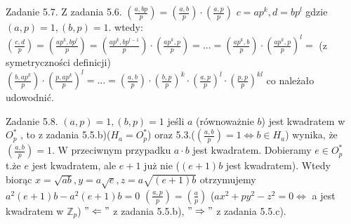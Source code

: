 \documentclass{article}
\begin{document}
Zadanie 5.7.
\newline
\newline
Z zadania 5.6. $(\frac{a,bp}{p})=(\frac{a,b}{p})\cdot(\frac{a,p}{p})$\newline
$c=ap^k,d=bp^l$ gdzie $(a,p)=1,(b,p)=1$. wtedy:\newline
$(\frac{c,d}{p})=(\frac{ap^k,bp^l}{p})=(\frac{ap^k,bp^{l-1}}{p})\cdot(\frac{ap^k,p}{p})=...=(\frac{ap^k,b}{p})\cdot(\frac{ap^k,p}{p})^l=$ (z symetryczności definicji)
$(\frac{b,ap^k}{p})\cdot(\frac{p,ap^k}{p})^l=...=(\frac{a,b}{p})\cdot(\frac{b,p}{p})^k\cdot(\frac{a,p}{p})^l\cdot(\frac{p,p}{p})^{kl}$ co należało udowodnić.
\newline

Zadanie 5.8.
\newline
\newline
$(a,p)=1,(b,p)=1$ jeśli $a$ (równoważnie $b$) jest kwadratem w $O_p^*$ , to z zadania 5.5.b)($H_a=O_p^*$) oraz 5.3.($(\frac{a,b}{p})=1\Leftrightarrow b\in H_a$) wynika, że $(\frac{a,b}{p})=1$.\newline
W przeciwnym przypadku $a\cdot b$ jest kwadratem. Dobieramy $e\in O_p^*$ t.że $e$ jest kwadratem, ale $e+1$ już nie ($(e+1)b$ jest kwadratem).
Wtedy biorąc $x=\sqrt{ab}, y=a\sqrt{e},z=a\sqrt{(e+1)b}$ otrzymujemy $a^2(e+1)b-a^2(e+1)b=0$\newline 
$(\frac{a,p}{p})=(\frac{a}{p})$ ($ax^2+py^2-z^2=0\Leftrightarrow$ a jest kwadratem w $\mathbb{Z}_p$) $"\Leftarrow"$ z zadania 5.5.b), $"\Rightarrow"$ z zadania 5.5.c).\newline
\newline
\end{document}
